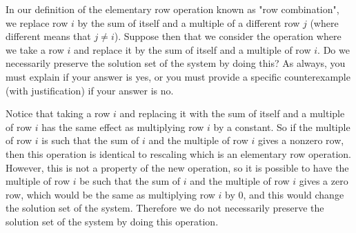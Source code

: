\documentclass[12pt]{article}
\newenvironment{problem}[2][Problem]
{
	\begin{trivlist} 
		\item[\hskip \labelsep {\bfseries #1 #2:}]
	}
{
	\end{trivlist}
	}
\newenvironment{solution}[1][Solution]
{
	\begin{trivlist} 
		\item[\hskip \labelsep {\itshape #1:}]
	}
	{
	\end{trivlist}
}
\begin{document}
\begin{problem}{1}
In our definition of the elementary row operation known as "row combination", we replace row $i$ by the sum of itself and a multiple of a different row $j$ (where different means that $j \neq i$). Suppose then that we consider the operation where we take a row $i$ and replace it by the sum of itself and a multiple of row $i$. Do we necessarily preserve the solution set of the system by doing this? As always, you must explain if your answer is yes, or you must provide a specific counterexample (with justification) if your answer is no.
\noindent
\newline
\newline
\begin{solution}
Notice that taking a row $i$ and replacing it with the sum of itself and a multiple of row $i$ has the same effect as multiplying row $i$ by a constant. So if the multiple of row $i$ is such that the sum of $i$ and the multiple of row $i$ gives a nonzero row, then this operation is identical to rescaling which is an elementary row operation. However, this is not a property of the new operation, so it is possible to have the multiple of row $i$ be such that the sum of $i$ and the multiple of row $i$ gives a zero row, which would be the same as multiplying row $i$ by $0$, and this would change the solution set of the system. Therefore we do not necessarily preserve the solution set of the system by doing this operation.
\end{solution}
\end{problem}
\end{document}
